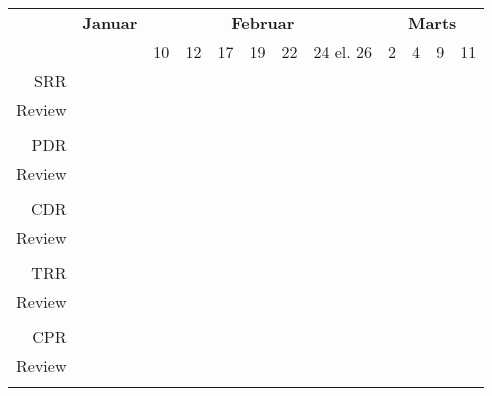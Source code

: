 \begin{tabular}{rlllllllllll}
\multicolumn{1}{c}{\textbf{}} &
\multicolumn{1}{c}{\cellcolor[HTML]{9AFF99}\textbf{Januar}} &
\multicolumn{6}{c}{\cellcolor[HTML]{FFCC67}\textbf{Februar}} &
\multicolumn{4}{c}{\cellcolor[HTML]{96FFFB}\textbf{Marts}} \\
& & 10 & 12 & 17 & 19 & 22 & 24 el. 26 & 2 & 4 & 9 & 11 \\ \hline

SRR    & & \cellcolor[HTML]{FD6864} & & & & & & & & & \\
Review & & & \cellcolor[HTML]{9698ED} & & & & & & & & \\ \\
PDR    & & & & \cellcolor[HTML]{FD6864} & & & & & & & \\
Review & & & & & \cellcolor[HTML]{9698ED} & & & & & & \\ \\
CDR    & & & & & & \cellcolor[HTML]{FD6864} & & & & & \\
Review & & & & & & & \cellcolor[HTML]{9698ED} & & & & \\ \\
TRR    & & & & & & & & \cellcolor[HTML]{FD6864} & & & \\
Review & & & & & & & & & \cellcolor[HTML]{9698ED} & & \\ \\
CPR    & & & & & & & & & & \cellcolor[HTML]{FD6864} & \\
Review & & & & & & & & & & & \cellcolor[HTML]{9698ED}\\ \\


\end{tabular}
